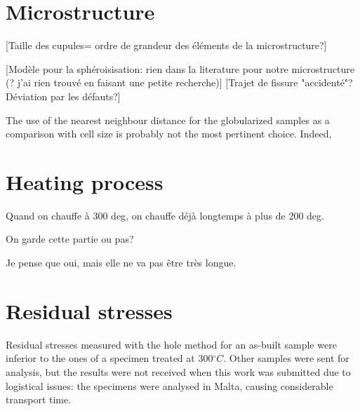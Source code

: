 \section{Microstructure}
\label{DMMM}

[Taille des cupules= ordre de grandeur des éléments de la microstructure?] 

[Modèle pour la sphéroisisation: rien dans la literature pour notre microstructure (? j'ai rien trouvé en faisant une petite recherche)]
[Trajet de fissure "accidenté"? Déviation par les défauts?]

The use of the nearest neighbour distance for the globularized samples as a comparison with cell size is probably not the most pertinent choice. Indeed, 

\section{Heating process}
Quand on chauffe à 300 deg, on chauffe déjà longtemps à plus de 200 deg.

 On garde cette partie ou pas?
 
 Je pense que oui, mais elle ne va pas être très longue.






\label{D-MP}

\section{Residual stresses}
Residual stresses measured with the hole method for an as-built sample were inferior to the ones of a specimen treated at 300$^\circ C$. Other samples were sent for analysis, but the results were not received when this work was submitted due to logistical issues: the specimens were analysed in Malta, causing considerable transport time.\\

